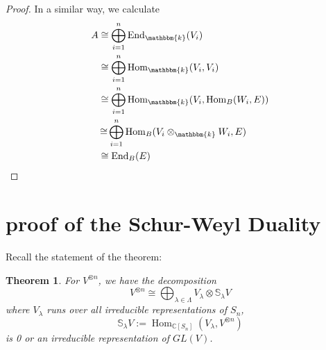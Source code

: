 \documentclass[11pt,oneside]{amsart}
\numberwithin{equation}{section}
\theoremstyle{plain}
\newtheorem{theorem}{Theorem}[section]
\theoremstyle{plain}
\numberwithin{equation}{section}
\theoremstyle{remark}
\newcommand{\Hom}{\operatorname{Hom}}
\newcommand{\End}{\operatorname{End}}
\begin{document}
\begin{proof}
In a similar way, we calculate
	\begin{equation*}
\begin{aligned}
A&\cong\bigoplus_{i=1}^n\End_{\mathbbm{k}}(V_i)\\
&\cong\bigoplus_{i=1}^n\Hom_{\mathbbm{k}}( V_i, V_i)\\
&\cong\bigoplus_{i=1}^n\Hom_{\mathbbm{k}}( V_i, \Hom_B(W_i,E))\\
&\mathop{\cong}\bigoplus_{i=1}^n\Hom_B( V_i \otimes_{\mathbbm{k}}W_i,E)\\
&\cong \End_B(E)\\
\end{aligned}
\end{equation*}
	\end{proof}

	
	
	\section{proof of the Schur-Weyl Duality} 
	Recall the statement of the theorem:
		\begin{theorem}
		For $V^{\otimes n}$, we have the decomposition
		$$V^{\otimes n} \cong \bigoplus_{\lambda \in \Lambda} V_{\lambda} \otimes \mathbb{S}_{\lambda}V$$
		where $V_{\lambda}$ runs over all irreducible representations of $S_n$, 
		$$\mathbb{S}_{\lambda}V:=\Hom_{\mathbb{C}[S_n]}(V_{\lambda},V^{\otimes n}) $$
		is 0 or an irreducible representation of $GL(V)$.
	\end{theorem}
\end{document}
